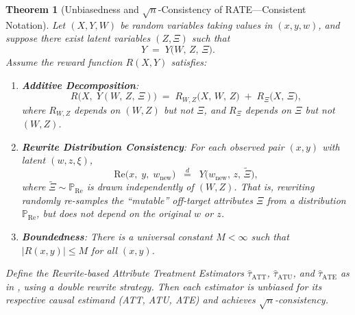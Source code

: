 \documentclass{article}
\newtheorem{theorem}{Theorem}[section]
\theoremstyle{definition}
\begin{document}
    \begin{theorem}[Unbiasedness and \(\sqrt{n}\)-Consistency of RATE---Consistent Notation]
    \label{thm:unbiased_rate_consistent}
    Let \((X, Y, W)\) be random variables taking values in \((x, y, w)\), and suppose there exist latent variables \((Z, \Xi)\) such that
    \[
    Y \;=\; Y\bigl(W,\,Z,\,\Xi\bigr).
    \]
    Assume the reward function \(R(X,Y)\) satisfies:
    
    \begin{enumerate}
    \item[\textbf{(A1)}] \textbf{Additive Decomposition}: 
    \[
    R\bigl(X,\;Y(W,\,Z,\,\Xi)\bigr)
    \;=\;
    R_{W,Z}\bigl(X,\,W,\,Z\bigr)
    \;+\;
    R_{\Xi}\bigl(X,\,\Xi\bigr),
    \]
    where \(R_{W,Z}\) depends on \((W,Z)\) but not \(\Xi\), and \(R_\Xi\) depends on \(\Xi\) but not \((W,Z)\).
    
    \item[\textbf{(A2)}] \textbf{Rewrite Distribution Consistency}: For each observed pair \((x,y)\) with latent \((w,z,\xi)\),  
    \[
    \text{Re}\bigl(x,\;y,\;w_{\text{new}}\bigr)
    \;\;\stackrel{d}{=}\;\;
    Y\bigl(w_{\text{new}},\,z,\,\widetilde{\Xi}\bigr),
    \]
    where \(\widetilde{\Xi}\sim \mathbb{P}_{\mathrm{Re}}\) is drawn independently of \((W,Z)\).  That is, rewriting randomly re-samples the ``mutable'' off-target attributes \(\Xi\) from a distribution \(\mathbb{P}_{\mathrm{Re}}\), but does not depend on the original \(w\) or \(z\).
    
    \item[\textbf{(A3)}] \textbf{Boundedness}: There is a universal constant \(M<\infty\) such that \(\bigl|R(x,y)\bigr|\le M\) for all \((x,y)\).
    \end{enumerate}
    
    Define the Rewrite-based Attribute Treatment Estimators \(\hat{\tau}_{\text{ATT}}\), \(\hat{\tau}_{\text{ATU}}\), and \(\hat{\tau}_{\text{ATE}}\) as in , using a \emph{double rewrite} strategy. Then each estimator is unbiased for its respective causal estimand (ATT, ATU, ATE) and achieves \(\sqrt{n}\)-consistency.
    \end{theorem}
    
\end{document}
